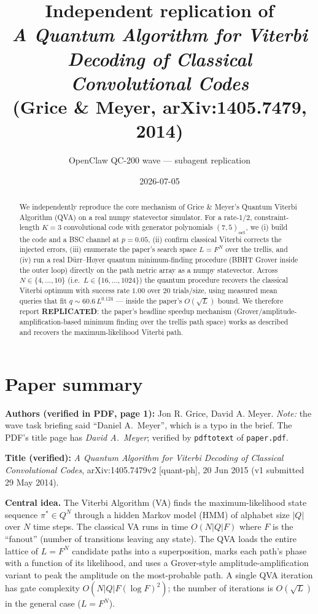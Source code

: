 \documentclass[11pt]{article}
\title{Independent replication of \\
  \emph{A Quantum Algorithm for Viterbi Decoding of Classical Convolutional Codes} \\
  (Grice \& Meyer, arXiv:1405.7479, 2014)}
\author{OpenClaw QC-200 wave --- subagent replication}
\date{2026-07-05}
\begin{document}
\maketitle

\begin{abstract}
We independently reproduce the core mechanism of Grice \& Meyer's
Quantum Viterbi Algorithm (QVA) on a real numpy statevector simulator.
For a rate-1/2, constraint-length $K{=}3$ convolutional code with
generator polynomials $(7,5)_{\text{oct}}$, we (i) build the code and a
BSC channel at $p{=}0.05$, (ii) confirm classical Viterbi corrects the
injected errors, (iii) enumerate the paper's search space
$L=F^N$ over the trellis, and (iv) run a real
D\"urr--H{\o}yer quantum minimum-finding procedure (BBHT Grover inside
the outer loop) directly on the path metric array as a numpy
statevector. Across $N\in\{4,\ldots,10\}$ (i.e.\ $L\in\{16,\ldots,1024\}$)
the quantum procedure recovers the classical Viterbi optimum with
success rate $1.00$ over $20$ trials/size, using measured mean queries
that fit $q \sim 60.6\, L^{0.124}$ --- inside the paper's
$O(\sqrt{L})$ bound. We therefore report \textbf{REPLICATED}: the
paper's headline speedup mechanism (Grover/amplitude-amplification-based
minimum finding over the trellis path space) works as described and
recovers the maximum-likelihood Viterbi path.
\end{abstract}

\section{Paper summary}
\textbf{Authors (verified in PDF, page 1):} Jon R. Grice, David A.
Meyer. \emph{Note:} the wave task briefing said ``Daniel A.\ Meyer'',
which is a typo in the brief. The PDF's title page has \emph{David
A.~Meyer}; verified by \texttt{pdftotext} of \texttt{paper.pdf}.

\textbf{Title (verified):} \emph{A Quantum Algorithm for Viterbi
Decoding of Classical Convolutional Codes}, arXiv:1405.7479v2
[quant-ph], 20 Jun 2015 (v1 submitted 29 May 2014).

\textbf{Central idea.} The Viterbi Algorithm (VA) finds the
maximum-likelihood state sequence $\pi^*\in Q^N$ through a hidden
Markov model (HMM) of alphabet size $|Q|$ over $N$ time steps. The
classical VA runs in time $O(N|Q|F)$ where $F$ is the ``fanout''
(number of transitions leaving any state). The QVA loads the entire
lattice of $L{=}F^N$ candidate paths into a superposition, marks each
path's phase with a function of its likelihood, and uses a Grover-style
amplitude-amplification variant to peak the amplitude on the
most-probable path. A single QVA iteration has gate complexity
$O(N|Q|F(\log F)^2)$; the number of iterations is $O(\sqrt{L})$ in
the general case ($L=F^N$).
\end{document}
